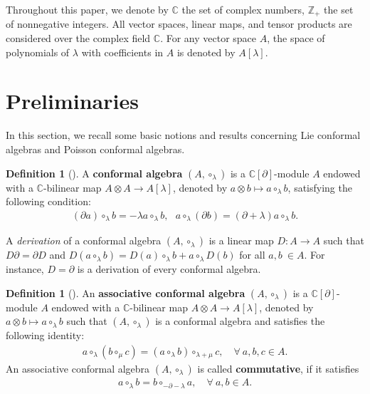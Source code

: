 \documentclass[11pt,letterpaper,reqno]{amsart}
\theoremstyle{definition}
\newtheorem{definition}[theorem]{Definition}
\numberwithin{equation}{section}
\begin{document}
Throughout this paper, we denote by $\mathbb{C}$ the set of complex numbers, $\mathbb{Z}_{+}$ the set of nonnegative integers. All vector spaces, linear maps, and tensor products are considered over the complex field $\mathbb{C}$.
For any vector space $A$, the space of polynomials of $\lambda$ with coefficients in $A$ is denoted by $A[\lambda]$.

\section{Preliminaries}\label{sec2}
In this section, we recall some basic notions and results concerning Lie conformal algebras and Poisson conformal algebras.
\begin{definition}[\cite{Kac99}]
A {\bf conformal algebra} $(A,\circ_\lambda)$ is a $\mathbb{C}[\partial]$-module $A$ endowed with a $\mathbb{C}$-bilinear map $A\otimes A\to A[\lambda]$, denoted by $a\otimes b\mapsto a \circ_{\lambda}b$, satisfying the following condition:
   \begin{align}
        (\partial a)\circ_{\lambda}b=-\lambda a\circ_{\lambda}b,~~~a\circ_{\lambda}(\partial b)=(\partial+\lambda)a\circ_{\lambda}b.
   \end{align}
\end{definition}
A \emph{derivation} of a conformal algebra $(A,\circ_\lambda)$ is a linear map $D: A\rightarrow A$ such that $D\partial=\partial D$ and $D(a\circ_{\lambda} b)=D(a)\circ_{\lambda} b+a\circ_{\lambda} D(b)$ for all $a,b~\in A$.
For instance, $D=\partial$ is a derivation of every conformal algebra.
\begin{definition}[\cite{Kac98}]
An {\bf associative conformal algebra} $(A,\circ_\lambda)$ is a $\mathbb{C}[\partial]$-module $A$ endowed with a $\mathbb{C}$-bilinear map $A\otimes A\to A[\lambda]$, denoted by $a\otimes b\mapsto a \circ_{\lambda}b$ such that $(A,\circ_\lambda)$ is a conformal algebra and satisfies the following identity:
   \begin{align}\label{ly}
      a\circ_{\lambda}\left(b\circ_{\mu} c\right)=\left(a\circ_{\lambda} b\right)\circ_{\lambda+\mu} c,\quad \forall ~a,b,c\in {A}.
   \end{align}
An associative conformal algebra $(A,\circ_\lambda)$ is called {\bf commutative}, if it satisfies
   \begin{align}
        a\circ_\lambda b=b\circ_{-\partial-\lambda}a,\quad \forall ~a,b\in {A}.
   \end{align}
\end{definition}
\end{document}
